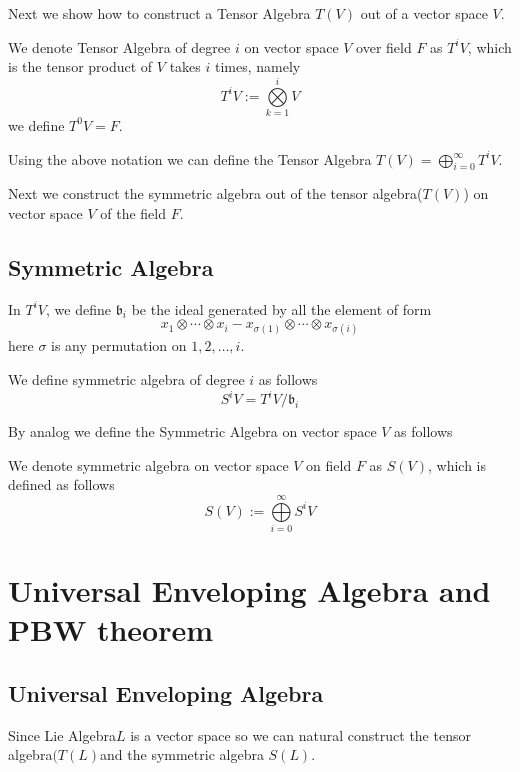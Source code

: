 \documentclass[11pt]{article}
\begin{document}
Next we show how to construct a Tensor Algebra \(T(V)\) out of a vector space \(V\).

\begin{definition}
We denote Tensor Algebra of degree \(i\) on vector space \(V\) over field \(F\) as \(T^iV\), which is the tensor product of \(V\) takes \(i\) times, namely
\[
T^iV := \bigotimes\limits_{k = 1}^iV
\]
we define \(T^0V = F\).
\end{definition}

Using the above notation we can define the Tensor Algebra \(T(V) = \bigoplus\limits_{i = 0}^{\infty} T^iV\).

Next we construct the symmetric algebra out of the tensor algebra(\(T(V)\)) on vector space \(V\) of the field \(F\).
\subsection{Symmetric Algebra}
\label{sec:org2b7caf5}
\begin{definition}
In \(T^iV\), we define \(\mathfrak{b}_i\) be the ideal generated by all the element of form
\[
x_1 \otimes \cdots \otimes x_i - x_{\sigma(1)} \otimes \cdots \otimes x_{\sigma(i)}
\]
here \(\sigma\) is any permutation on \({1,2,\dots,i}\).
\end{definition}

\begin{definition}
We define symmetric algebra of degree \(i\) as follows
\[
S^iV = T^iV / \mathfrak{b}_i
\]
\end{definition}

By analog we define the Symmetric Algebra on vector space \(V\) as follows
\begin{definition}
We denote symmetric algebra on vector space \(V\) on field \(F\) as \(S(V)\), which is defined as follows
\[
S(V) := \bigoplus\limits_{i = 0}^{\infty} S^iV
\]
\end{definition}
\section{Universal Enveloping Algebra and PBW theorem}
\label{sec:org6d719ff}
\subsection{Universal Enveloping Algebra}
\label{sec:org06a9fbd}
Since Lie Algebra\(L\) is a vector space so we can natural construct the tensor algebra\((T(L)\)and the symmetric algebra \(S(L)\).
\end{document}
